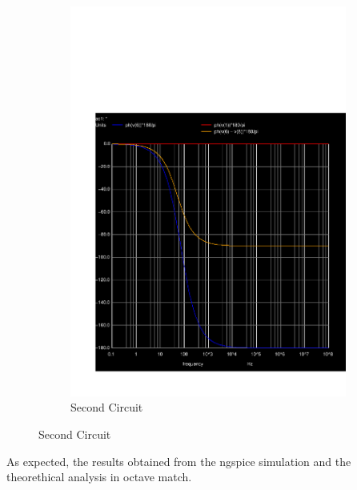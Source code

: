 \begin{figure}[H]
\begin{subfigure}{0.42\textwidth}
\includegraphics[width=\textwidth]{sim5_ph.pdf}
\caption{Second Circuit}
\label{fig:second}
\end{subfigure}
\end{figure}

As expected, the results obtained from the ngspice simulation and the theorethical analysis in octave match.













